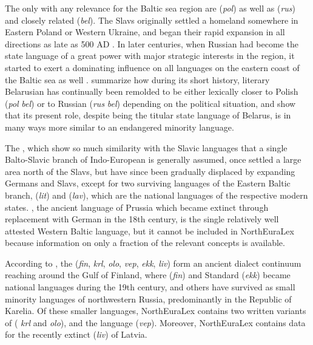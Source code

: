The only  with any relevance for the Baltic sea region are  (\textit{pol}) as well as  (\textit{rus}) and closely related  (\textit{bel}). The Slavs originally settled a homeland somewhere in Eastern Poland or Western Ukraine, and began their rapid expansion in all directions as late as 500 AD \citep{kobylinski2005}. In later centuries, when Russian had become the state language of a great power with major strategic interests in the region, it started to exert a dominating influence on all languages on the eastern coast of the Baltic sea as well \citep{decsy1988}. \cite{smolicz_radzik_2004} summarize how during its short history, literary Belarusian has continually been remolded to be either lexically closer to Polish (\textit{pol} \arrowOA \textit{bel}) or to Russian (\textit{rus} \arrowOA \textit{bel}) depending on the political situation, and show that its present role, despite being the titular state language of Belarus, is in many ways more 
similar to an endangered minority language.

The , which show so much similarity with the Slavic languages that a single Balto-Slavic branch of Indo-European is generally assumed, once settled a large area north of the Slavs, but have since been gradually displaced by expanding Germans and Slavs, except for two surviving languages of the Eastern Baltic branch,  (\textit{lit}) and  (\textit{lav}), which are the national languages of the respective modern states. , the ancient language of Prussia which became extinct through replacement with German in the 18th century, is the single relatively well attested Western Baltic language, but it cannot be included in NorthEuraLex because information on only a fraction of the relevant concepts is available.

According to \cite{viitso1998}, the  (\textit{fin}, \textit{krl}, \textit{olo}, \textit{vep}, \textit{ekk}, \textit{liv}) form an ancient dialect continuum reaching around the Gulf of Finland, where  (\textit{fin}) and Standard  (\textit{ekk}) became national languages during the 19th century, and others have survived as small minority languages of northwestern Russia, predominantly in the Republic of Karelia. Of these smaller languages, NorthEuraLex contains two written variants of  ( \textit{krl} and  \textit{olo}), and the  language (\textit{vep}). Moreover, NorthEuraLex contains data for the recently extinct  (\textit{liv}) of Latvia.

